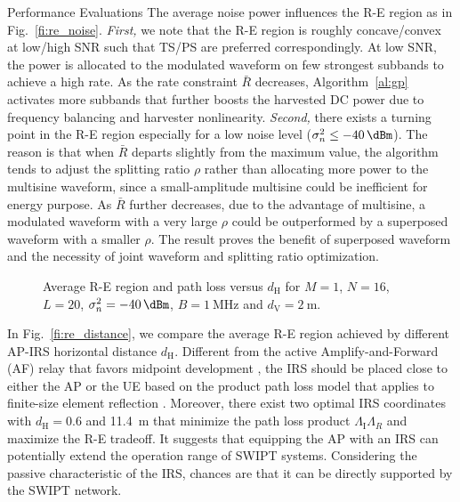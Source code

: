 \documentclass[journal]{IEEEtran}
\begin{document}
\begin{section}{Performance Evaluations}
		The average noise power influences the R-E region as in Fig.~\ref{fi:re_noise}. \textit{First,} we note that the R-E region is roughly concave/convex at low/high SNR such that TS/PS are preferred correspondingly. At low SNR, the power is allocated to the modulated waveform on few strongest subbands to achieve a high rate. As the rate constraint $\bar{R}$ decreases, Algorithm~\ref{al:gp} activates more subbands that further boosts the harvested DC power due to frequency balancing and harvester nonlinearity. \textit{Second,} there exists a turning point in the R-E region especially for a low noise level ($\sigma_n^2 \le \SI{-40}{\dBm}$). The reason is that when $\bar{R}$ departs slightly from the maximum value, the algorithm tends to adjust the splitting ratio $\rho$ rather than allocating more power to the multisine waveform, since a small-amplitude multisine could be inefficient for energy purpose. As $\bar{R}$ further decreases, due to the advantage of multisine, a modulated waveform with a very large $\rho$ could be outperformed by a superposed waveform with a smaller $\rho$. The result proves the benefit of superposed waveform and the necessity of joint waveform and splitting ratio optimization.

		\begin{figure}[!t]
			\centering
			\caption{Average R-E region and path loss versus $d_{\mathrm{H}}$ for $M=1$, $N=16$, $L=20$, $\sigma_n^2=\SI{-40}{\dBm}$, $B=\SI{1}{\MHz}$ and $d_{\mathrm{V}}=\SI{2}{\meter}$.}
		\end{figure}

		In Fig.~\ref{fi:re_distance}, we compare the average R-E region achieved by different AP-IRS horizontal distance $d_{\mathrm{H}}$. Different from the active Amplify-and-Forward (AF) relay that favors midpoint development \cite{Li2017}, the IRS should be placed close to either the AP or the UE based on the product path loss model that applies to finite-size element reflection \cite{Ozdogan2020}. Moreover, there exist two optimal IRS coordinates with $d_{\mathrm{H}}=0.6$ and \SI{11.4}{\meter} that minimize the path loss product $\Lambda_{\mathrm{I}}\Lambda_R$ and maximize the R-E tradeoff. It suggests that equipping the AP with an IRS can potentially extend the operation range of SWIPT systems. Considering the passive characteristic of the IRS, chances are that it can be directly supported by the SWIPT network.


\end{section}
\end{document}
